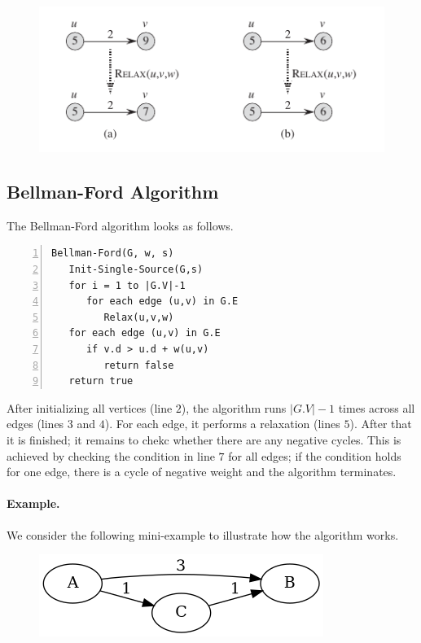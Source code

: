 \begin{figure}[H]
\centering
\includegraphics[scale=0.65]{images/sssp_4.png}
\end{figure}



\subsection{Bellman-Ford Algorithm}

The Bellman-Ford algorithm looks as follows.


\begin{Verbatim}[numbers=left, xleftmargin=5mm]
Bellman-Ford(G, w, s)
   Init-Single-Source(G,s)
   for i = 1 to |G.V|-1
      for each edge (u,v) in G.E
         Relax(u,v,w)
   for each edge (u,v) in G.E
      if v.d > u.d + w(u,v)
         return false
   return true
\end{Verbatim}

After initializing all vertices (line $2$), the algorithm runs $|G.V|-1$ times across all edges (lines $3$ and $4$). For each edge, it performs a relaxation (lines $5$). After that it is finished; it remains to chekc whether there are any negative cycles. This is achieved by checking the condition in line $7$ for all edges; if the condition holds for one edge, there is a cycle of negative weight and the algorithm terminates.


\paragraph{Example.} We consider the following mini-example to illustrate how the algorithm works.

\begin{figure}[H]
\centering
\includegraphics[scale=0.5]{images/sssp_5.png}
\end{figure}

